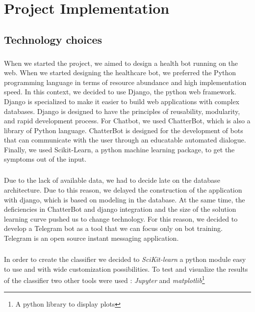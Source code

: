 \chapter{Project Implementation} 

\section{Technology choices}

\paragraph{}
When we	started	the	project,	we	aimed	to	design	a	health	bot	running	on	the	web.	When	we	started	designing	the	healthcare	bot,	we	preferred	the	Python	programming	language	in	 terms	of	resource	abundance	and	high	implementation	speed.	In	this	context,	we	decided	to	use	Django,	the	python	web	framework.	Django	is	specialized	to	make	it	easier	to	build	web	applications	with	complex	databases\cite{bib:misc:7}.	Django	is	designed	to	have	the	principles	of	reusability, modularity,	and	rapid	development	process.	For	Chatbot,	we	used	ChatterBot,	which	is	also	a	library	of	Python	language.	ChatterBot	is	designed	for	the	development	of	bots	that	can	communicate	with	the	user	through	an	educatable	automated	dialogue\cite{bib:misc:8}.	Finally,	we	used	Scikit-Learn,	a	python	machine	learning	package,	to	get	the	symptoms	out	of	the	input.	
\paragraph{}
Due	to	the	lack	of	available	data,	we	had	to	decide	late	on	the	database	architecture.	Due	to	this	reason,	we	delayed	the	construction	of	the	application	with	django,	which	is	based	on	modeling	in	the	database.	At	the	same	time,	the	deficiencies	in	ChatterBot	and	django	integration	and	the	size	of	the	solution	learning	curve	pushed	us	to	change	technology.	For	this	reason,	we	decided	to	develop	a	Telegram	bot	as	a	tool	that	we	can	focus	only	on	bot	training\cite{bib:misc:9}.	Telegram	is	an	open	source	instant	messaging	application.	

\paragraph{}
In order to create the classifier we decided to \textit{SciKit-learn}\cite{bib:misc:2} a python module easy to use and with wide customization possibilities. To test and visualize the results of the classifier two other tools were used : \textit{Jupyter}\cite{bib:misc:3} and \textit{matplotlib}\footnote{A python library to display plots}

